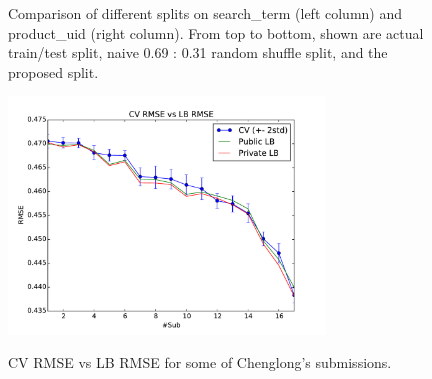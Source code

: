 \documentclass[12pt]{article}
\begin{document}
\begin{figure}[!htp]
    \caption{Comparison of different splits on search\_term (left column) and product\_uid (right column). From top to bottom, shown are actual train/test split, naive 0.69 : 0.31 random shuffle split, and the proposed split.}
    \label{Fig:Splitter}
\end{figure}

\begin{figure}
  \centering
  \includegraphics[width=0.75\textwidth]{../Fig/CV_LB_Chenglong.pdf}\\
  \caption{CV RMSE vs LB RMSE for some of Chenglong's submissions.}
  \label{Fig:CV_LB_Chenglong}
\end{figure}
\end{document}
